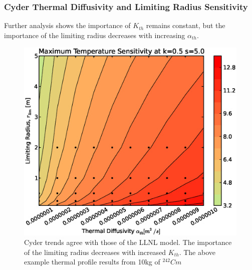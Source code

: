 \begin{frame}[ctb!]
\frametitle{Cyder Thermal Diffusivity and Limiting Radius Sensitivity}
\footnotesize{
Further \Cyder analysis shows the importance of $K_{th}$ remains constant, but 
the importance of the limiting radius decreases with increasing $\alpha_{th}$.
\begin{figure}[htbp!]
\begin{center}
\includegraphics[height=0.7\textheight]{./thermal_demonstration/diffusivity/ar.eps}
\end{center}
\caption[$\alpha_{th}$ vs. $r_{lim}$ Sensitivity in Cyder]
{Cyder trends agree with 
those of the LLNL model. The importance of the limiting radius decreases with 
increased $K_{th}$. The above example thermal profile results from 10kg of 
$^{242}Cm$}
\label{fig:ak}
\end{figure}
}
\end{frame}
